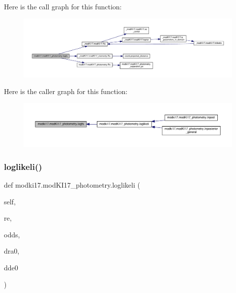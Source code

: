 Here is the call graph for this function\+:\nopagebreak
\begin{figure}[H]
\begin{center}
\leavevmode
\includegraphics[width=350pt]{dd/db2/classmodki17_1_1modKI17__photometry_a2d4b3707792c8c224068ad6715d42545_cgraph}
\end{center}
\end{figure}
Here is the caller graph for this function\+:\nopagebreak
\begin{figure}[H]
\begin{center}
\leavevmode
\includegraphics[width=350pt]{dd/db2/classmodki17_1_1modKI17__photometry_a2d4b3707792c8c224068ad6715d42545_icgraph}
\end{center}
\end{figure}
\mbox{\label{classmodki17_1_1modKI17__photometry_a1c7a3d4028e066698b0b379ba46f61d6}} 
\subsubsection{\texorpdfstring{loglikeli()}{loglikeli()}}
{\footnotesize\ttfamily def modki17.\+mod\+K\+I17\+\_\+photometry.\+loglikeli (\begin{DoxyParamCaption}\item[{}]{self,  }\item[{}]{re,  }\item[{}]{odds,  }\item[{}]{dra0,  }\item[{}]{dde0 }\end{DoxyParamCaption})}



